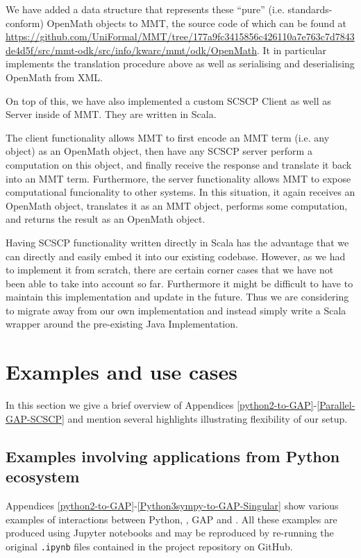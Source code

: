 \documentclass{deliverablereport}
\begin{document}
We have added a data structure that represents these ``pure'' (i.e. standards-conform) OpenMath objects to MMT, the source code of which can be found at \url{https://github.com/UniFormal/MMT/tree/177a9fc3415856c426110a7e763c7d7843de4d5f/src/mmt-odk/src/info/kwarc/mmt/odk/OpenMath}.
It in particular implements the translation procedure above as well as serialising and deserialising OpenMath from XML.

On top of this, we have also implemented a custom SCSCP Client as well as Server inside of MMT.
They are written in Scala.

The client functionality allows MMT to first encode an MMT term (i.e. any object) as an OpenMath object, then have any  SCSCP server perform a computation on this object, and finally receive the response and translate it back into an MMT term.
Furthermore, the server functionality allows MMT to expose computational funcionality to other systems.
In this situation, it again receives an OpenMath object, translates it as an MMT object, performs some computation, and returns the result as an OpenMath object.

Having SCSCP functionality written directly in Scala has the advantage that we can directly and easily embed it into our existing codebase.
However, as we had to implement it from scratch, there are certain corner cases that we have not been able to take into account so far.
Furthermore it might be difficult to have to maintain this implementation and update in the future.
Thus we are considering to migrate away from our own implementation and instead simply write a Scala wrapper around the pre-existing Java Implementation.


\section{Examples and use cases}\label{examples}

In this section we give a brief overview of 
Appendices \ref{python2-to-GAP}-\ref{Parallel-GAP-SCSCP}
and mention several highlights illustrating flexibility of our setup.

\subsection{Examples involving applications from Python ecosystem}

Appendices \ref{python2-to-GAP}-\ref{Python3sympy-to-GAP-Singular}
show various examples of interactions between Python, \Sage, GAP 
and \Singular. All these examples are produced using Jupyter notebooks
and may be reproduced by re-running the original {\tt .ipynb} files
contained in the project repository on GitHub.
\end{document}
